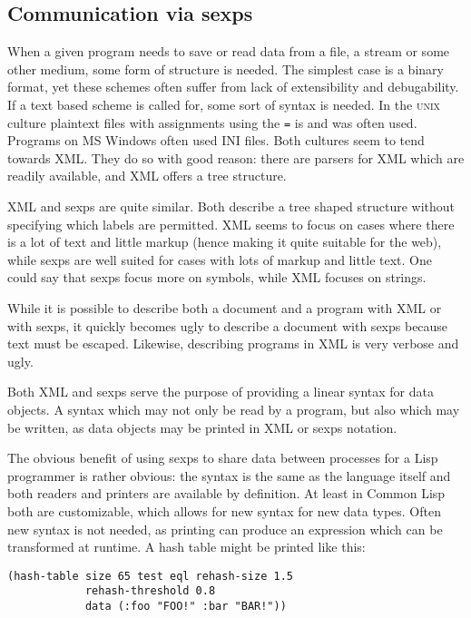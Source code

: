 \documentclass[a4paper,10pt,twoside]{report}
\newcommand{\cl}{Common Lisp}
\newcommand{\unix}{\textsc{unix}}
\newcommand{\windows}{MS Windows\texttrademark}
\begin{document}
\subsection{Communication via sexps}
\label{subsec:sexp-communication}

When a given program needs to save or read data from a file, a stream or some
other medium, some form of structure is needed.  The simplest case is a binary
format, yet these schemes often suffer from lack of extensibility and
debugability.  If a text based scheme is called for, some sort of syntax is
needed.  In the \unix{} culture plaintext files with assignments using the
\texttt{=} is and was often used.  Programs on \windows{} often used INI files.
Both cultures seem to tend towards XML.  They do so with good reason: there are
parsers for XML which are readily available, and XML offers a tree structure.

XML and sexps are quite similar.  Both describe a tree shaped structure without
specifying which labels are permitted.  XML seems to focus on cases where there
is a lot of text and little markup (hence making it quite suitable for the web),
while sexps are well suited for cases with lots of markup and little text.  One
could say that sexps focus more on symbols, while XML focuses on strings.

While it is possible to describe both a document and a program with XML or with
sexps, it quickly becomes ugly to describe a document with sexps because text
must be escaped.  Likewise, describing programs in XML is very verbose and ugly.

Both XML and sexps serve the purpose of providing a linear syntax for data
objects.  A syntax which may not only be read by a program, but also which may
be written, as data objects may be printed in XML or sexps notation.

The obvious benefit of using sexps to share data between processes for a Lisp
programmer is rather obvious: the syntax is the same as the language itself and
both readers and printers are available by definition.  At least in \cl{} both
are customizable, which allows for new syntax for new data types.  Often new
syntax is not needed, as printing can produce an expression which can be
transformed at runtime.  A hash table might be printed like this:

\pagebreak

\begin{lstlisting}[style=lispinline]
(hash-table size 65 test eql rehash-size 1.5
            rehash-threshold 0.8
            data (:foo "FOO!" :bar "BAR!"))
\end{lstlisting}
\end{document}
